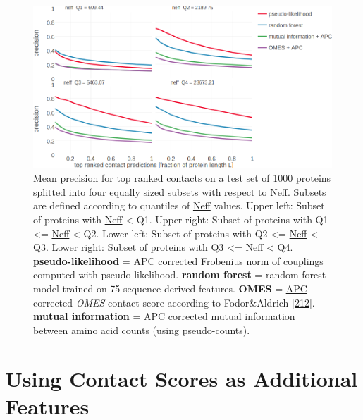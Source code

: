 \documentclass[11pt,a4paper,twoside]{book}
\theoremstyle{definition}
\theoremstyle{definition}
\theoremstyle{remark}
\begin{document}
\begin{figure}
\includegraphics[width=1\linewidth]{img/random_forest_contact_prior/precision_vs_rank_facetted_by_neff_notitle} \caption{Mean precision for top ranked contacts
on a test set of 1000 proteins splitted into four equally sized subsets
with respect to \protect\hyperlink{abbrev}{Neff}. Subsets are defined
according to quantiles of \protect\hyperlink{abbrev}{Neff} values. Upper
left: Subset of proteins with \protect\hyperlink{abbrev}{Neff}
\textless{} Q1. Upper right: Subset of proteins with Q1 \textless{}=
\protect\hyperlink{abbrev}{Neff} \textless{} Q2. Lower left: Subset of
proteins with Q2 \textless{}= \protect\hyperlink{abbrev}{Neff}
\textless{} Q3. Lower right: Subset of proteins with Q3 \textless{}=
\protect\hyperlink{abbrev}{Neff} \textless{} Q4.
\textbf{pseudo-likelihood} = \protect\hyperlink{abbrev}{APC} corrected
Frobenius norm of couplings computed with pseudo-likelihood.
\textbf{random forest} = random forest model trained on 75 sequence
derived features. \textbf{OMES} = \protect\hyperlink{abbrev}{APC}
corrected \emph{OMES} contact score according to Fodor\&Aldrich
{[}\protect\hyperlink{ref-Fodor2004a}{212}{]}. \textbf{mutual
information} = \protect\hyperlink{abbrev}{APC} corrected mutual
information between amino acid counts (using pseudo-counts).}\label{fig:performance-neff-rf}
\end{figure}

\section{Using Contact Scores as Additional
Features}\label{using-contact-scores-as-additional-features}
\end{document}
